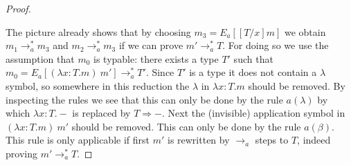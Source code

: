 \documentclass{LMCS}
\newcommand{\To}[0]{\Rightarrow}
\begin{document}
\begin{proof}
\begin{center}
\end{center}

The picture already shows that by choosing $m_3 = E_a[[T/x]m]$ we
obtain $m_1 \to_a^* m_3$ and  $m_2 \to_a^* m_3$ if we can prove 
$m'\to_a^* T$. For doing so we use the assumption that $m_0$ is
typable: there exists a type $T'$ such that 
$m_0 = E_a[(\lambda x:T. m)\ m'] \to_a^* T'$. Since $T'$ is a type 
it does not contain a $\lambda$ symbol, so somewhere in this
reduction the $\lambda$ in $\lambda x:T. m$ should be removed. By
inspecting the rules we see that this can only be done by the rule
$a(\lambda)$ by which $\lambda x:T. -$ is replaced by $T \To -$.
Next the (invisible) application symbol in $(\lambda x:T. m)\ m'$
should be removed. This can only be done by the rule $a(\beta)$.
This rule is only applicable if first $m'$ is rewritten by $\to_a$
steps to $T$, indeed proving $m'\to_a^* T$.
\end{proof}
\end{document}
